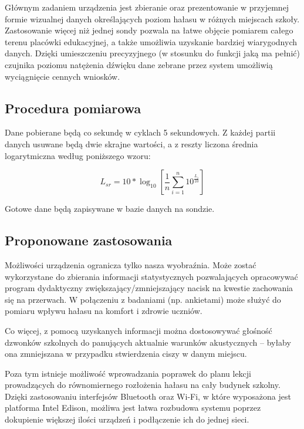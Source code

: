 \documentclass[12pt, a4paper]{article}
\begin{document}
Głównym zadaniem urządzenia jest zbieranie oraz prezentowanie w przyjemnej formie wizualnej danych określających poziom hałasu w różnych miejscach szkoły. Zastosowanie więcej niż jednej sondy pozwala na łatwe objęcie pomiarem całego terenu placówki edukacyjnej, a także umożliwia uzyskanie bardziej wiarygodnych danych. Dzięki umieszczeniu precyzyjnego (w stosunku do funkcji jaką ma pełnić) czujnika poziomu natężenia dźwięku dane zebrane przez system umożliwią wyciągnięcie cennych wniosków.

\subsection{Procedura pomiarowa}

Dane pobierane będą co sekundę w cyklach 5 sekundowych. Z każdej partii danych usuwane będą dwie skrajne wartości, a z reszty liczona średnia logarytmiczna według poniższego wzoru\cite{log}:

\Large
\begin{equation}
L_{sr} = 10*\log_{10}\left[\frac{1}{n}\displaystyle\sum_{i=1}^{n}10^{\frac{L_i}{10}}\right]
\end{equation}
\normalsize

Gotowe dane będą zapisywane w bazie danych na sondzie.

\subsection{Proponowane zastosowania}

Możliwości urządzenia ogranicza tylko nasza wyobraźnia. Może zostać wykorzystane do zbierania informacji statystycznych pozwalających opracowywać program dydaktyczny zwiększający/zmniejszający nacisk na kwestie zachowania się na przerwach. W połączeniu z badaniami (np. ankietami) może służyć do pomiaru wpływu hałasu na komfort i zdrowie uczniów.

Co więcej, z pomocą uzyskanych informacji można dostosowywać głośność dzwonków szkolnych do panujących aktualnie warunków akustycznych -- byłaby ona zmniejszana w przypadku stwierdzenia ciszy w danym miejscu.

Poza tym istnieje możliwość wprowadzania poprawek do planu lekcji prowadzących do równomiernego rozłożenia hałasu na cały budynek szkolny. Dzięki zastosowaniu interfejsów Bluetooth oraz Wi-Fi, w które wyposażona jest platforma Intel Edison, możliwa jest łatwa rozbudowa systemu poprzez dokupienie większej ilości urządzeń i podłączenie ich do jednej sieci.
\end{document}
